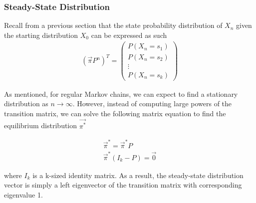 \documentclass[a4paper, 12pt]{article}
\begin{document}
	\subsubsection*{Steady-State Distribution}
	
	Recall from a previous section that the state probability distribution of $X_n$ given the starting distribution $X_0$ can be expressed as such
	\begin{equation*}
	\begin{aligned}
		 (\vec{\pi}P^n)^T =
		 \begin{pmatrix}
		 P(X_n = s_1) \\
		 P(X_n = s_2) \\ 
		 \vdots \\
		 P(X_n = s_k)
		 \end{pmatrix}
	\end{aligned}
	\end{equation*}
	
As mentioned, for regular Markov chains, we can expect to find a stationary distribution as $n \rightarrow \infty$. However, instead of computing large powers of the transition matrix, we can solve the following matrix equation to find the equilibrium distribution $\vec{\pi^*}$
	
	\begin{equation*}
	\begin{aligned}
		 \vec{\pi}^* = \vec{\pi}^*P \\
		 \vec{\pi}^*(I_k - P) = \vec{0}
	\end{aligned}
	\end{equation*}
    
where $I_k$ is a k-sized identity matrix. As a result, the steady-state distribution vector is simply a left eigenvector of the transition matrix with corresponding eigenvalue 1.\\
\end{document}
